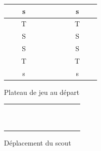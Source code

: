 \documentclass[a4paper]{scrreprt}
\begin{document}

\begin{figure}
    \centering
    \begin{tabular}{|c|c|c|c|c|c|c|c|c|c|c|c|}
    \hline
         &&\cellcolor{cgreen}s&&&&&&&\cellcolor{cred}s&&  \\ \hline
         &\cellcolor{yellow}&\cellcolor{cgreen}T&&&&&&&\cellcolor{cred}T&\cellcolor{yellow}&  \\ \hline
         &&\cellcolor{cgreen}S&&&&&&&\cellcolor{cred}S&&  \\ \hline
         &&\cellcolor{cgreen}S&&&&&&&\cellcolor{cred}S&&  \\ \hline
         &\cellcolor{yellow}&\cellcolor{cgreen}T&&&&&&&\cellcolor{cred}T&\cellcolor{yellow}&  \\ \hline
         &&\cellcolor{cgreen}s&&&&&&&\cellcolor{cred}s&&  \\ \hline
    \end{tabular}
    \caption{Plateau de jeu au départ}
    \label{fig:plateau}
\end{figure}

\begin{figure}
    \centering
    \begin{tabular}{|c|c|c|c|c|c|c|c|c|c|c|}
        \hline
        &&&&&&&&&&\\ \hline
        &\cellcolor{cblue}&&&&\cellcolor{cblue}&&&&\cellcolor{cblue}  &\\ \hline
        &&\cellcolor{cblue}&&&\cellcolor{cblue}&&&\cellcolor{cblue}&&\\ \hline
        &&&\cellcolor{cblue}&&\cellcolor{cblue}&&\cellcolor{cblue}&&  &\\ \hline
        &&&&\cellcolor{cblue}&\cellcolor{cblue}&\cellcolor{cblue}&&& &\\ \hline
        &\cellcolor{cblue}&\cellcolor{cblue}&\cellcolor{cblue}&\cellcolor{cblue}&\cellcolor{yellow}&\cellcolor{cblue}&\cellcolor{cblue}&\cellcolor{cblue}&\cellcolor{cblue}  &\\ \hline
        &&&&\cellcolor{cblue}&\cellcolor{cblue}&\cellcolor{cblue}&&& &\\ \hline
        &&&\cellcolor{cblue}&&\cellcolor{cblue}&&\cellcolor{cblue}&&  &\\ \hline
        &&\cellcolor{cblue}&&&\cellcolor{cblue}&&&\cellcolor{cblue}& &\\ \hline
        &\cellcolor{cblue}&&&&\cellcolor{cblue}&&&&\cellcolor{cblue} &\\ \hline
        &&&&&&&&&&\\ \hline
    \end{tabular}
    \caption{Déplacement du scout}
    \label{fig:scoutdep}
\end{figure}
\end{document}
